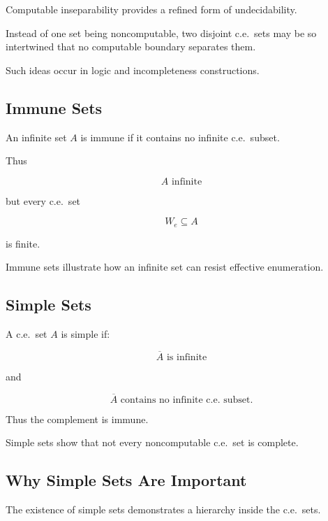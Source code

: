 Computable inseparability provides a refined form of undecidability.

Instead of one set being noncomputable, two disjoint c.e.\ sets may be so
intertwined that no computable boundary separates them.

Such ideas occur in logic and incompleteness constructions.

\subsection{Immune Sets}
\label{subsec:immune-sets}

An infinite set \(A\) is immune if it contains no infinite c.e.\ subset.

Thus

\[
\boxed{
A
\text{ infinite}
}
\]

but every c.e.\ set

\[
W_e\subseteq A
\]

is finite.

Immune sets illustrate how an infinite set can resist effective
enumeration.

\subsection{Simple Sets}
\label{subsec:simple-sets}

A c.e.\ set \(A\) is simple if:

\[
\boxed{
\overline{A}
\text{ is infinite}
}
\]

and

\[
\boxed{
\overline{A}
\text{ contains no infinite c.e.\ subset}.
}
\]

Thus the complement is immune.

Simple sets show that not every noncomputable c.e.\ set is complete.

\subsection{Why Simple Sets Are Important}
\label{subsec:why-simple-sets-important}

The existence of simple sets demonstrates a hierarchy inside the c.e.\
sets.


